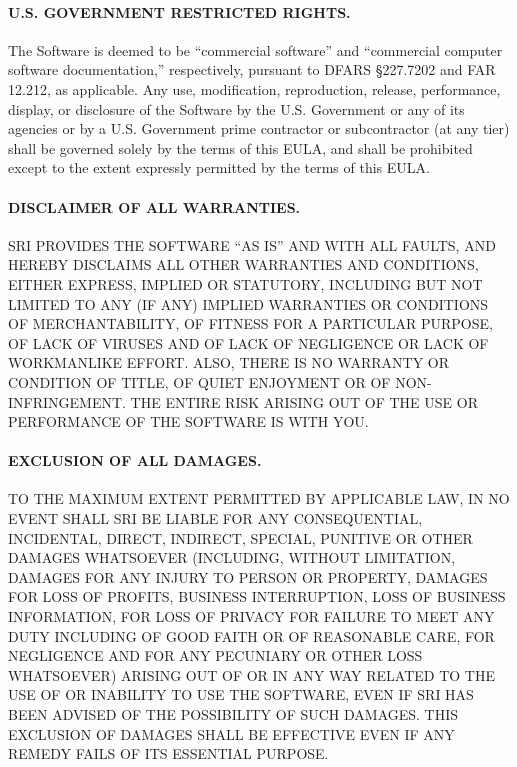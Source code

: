 \documentclass[11pt,twoside,fleqn,openright,titlepage]{cslreport}
\begin{document}
\begin{small}
\paragraph{U.S. GOVERNMENT RESTRICTED RIGHTS.}
The  Software is deemed  to be  ``commercial software'' and ``commercial
computer  software  documentation,'' respectively, pursuant  to  DFARS
\S 227.7202  and  FAR 12.212,  as  applicable.   Any use,  modification,
reproduction,  release,  performance, display,  or  disclosure of  the
Software  by the  U.S.  Government  or  any of  its agencies  or by  a
U.S. Government prime contractor  or subcontractor (at any tier) shall
be governed solely by the terms  of this EULA, and shall be prohibited
except to the extent expressly permitted by the terms of this EULA.


\paragraph{DISCLAIMER OF ALL WARRANTIES.}
SRI  PROVIDES THE SOFTWARE  ``AS IS''  AND WITH  ALL FAULTS,  AND HEREBY
DISCLAIMS ALL OTHER WARRANTIES AND CONDITIONS, EITHER EXPRESS, IMPLIED
OR  STATUTORY, INCLUDING  BUT  NOT  LIMITED TO  ANY  (IF ANY)  IMPLIED
WARRANTIES  OR  CONDITIONS  OF   MERCHANTABILITY,  OF  FITNESS  FOR  A
PARTICULAR PURPOSE,  OF LACK OF VIRUSES  AND OF LACK  OF NEGLIGENCE OR
LACK OF WORKMANLIKE EFFORT. ALSO, THERE IS NO WARRANTY OR CONDITION OF
TITLE,  OF QUIET ENJOYMENT  OR OF  NON-INFRINGEMENT.  THE  ENTIRE RISK
ARISING OUT OF THE USE OR PERFORMANCE OF THE SOFTWARE IS WITH YOU.


\paragraph{EXCLUSION OF ALL DAMAGES.}
TO THE MAXIMUM  EXTENT PERMITTED BY APPLICABLE LAW,  IN NO EVENT SHALL
SRI  BE LIABLE  FOR ANY  CONSEQUENTIAL, INCIDENTAL,  DIRECT, INDIRECT,
SPECIAL,  PUNITIVE  OR OTHER  DAMAGES  WHATSOEVER (INCLUDING,  WITHOUT
LIMITATION, DAMAGES FOR ANY INJURY  TO PERSON OR PROPERTY, DAMAGES FOR
LOSS OF PROFITS, BUSINESS  INTERRUPTION, LOSS OF BUSINESS INFORMATION,
FOR LOSS  OF PRIVACY FOR  FAILURE TO MEET  ANY DUTY INCLUDING  OF GOOD
FAITH OR OF  REASONABLE CARE, FOR NEGLIGENCE AND  FOR ANY PECUNIARY OR
OTHER LOSS WHATSOEVER) ARISING OUT OF OR IN ANY WAY RELATED TO THE USE
OF OR INABILITY  TO USE THE SOFTWARE, EVEN IF SRI  HAS BEEN ADVISED OF
THE POSSIBILITY OF  SUCH DAMAGES.  THIS EXCLUSION OF  DAMAGES SHALL BE
EFFECTIVE EVEN IF ANY REMEDY FAILS OF ITS ESSENTIAL PURPOSE.



\end{small}
\end{document}
